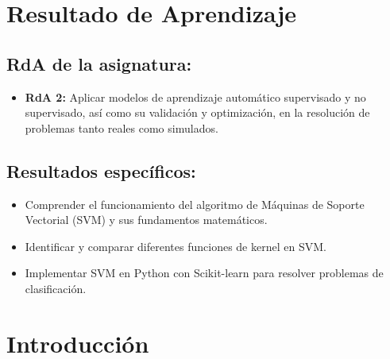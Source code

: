 \documentclass[a4,11pt]{aleph-notas}
\begin{document}
\encabezado


\section*{Resultado de Aprendizaje}

\subsection*{RdA de la asignatura:}
\begin{itemize}[leftmargin=*]
    \item \textbf{RdA 2:} Aplicar modelos de aprendizaje automático supervisado y no supervisado, así como su validación y optimización, en la resolución de problemas tanto reales como simulados.
\end{itemize}

\subsection*{Resultados específicos:}  
\begin{itemize}[leftmargin=*]  
    \item Comprender el funcionamiento del algoritmo de Máquinas de Soporte Vectorial (SVM) y sus fundamentos matemáticos.  
    \item Identificar y comparar diferentes funciones de kernel en SVM.  
    \item Implementar SVM en Python con Scikit-learn para resolver problemas de clasificación.  
\end{itemize}  

\section*{Introducción}  
\end{document}
